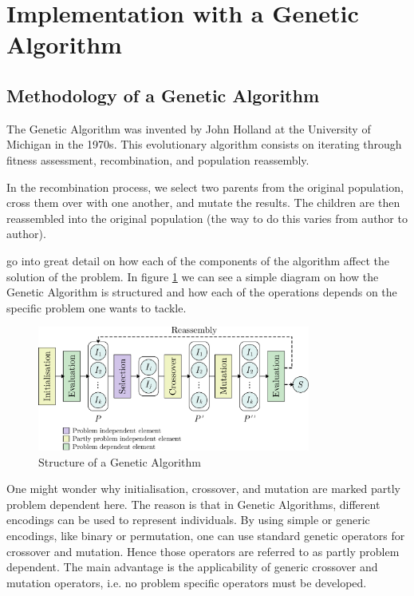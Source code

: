 \section{Implementation with a Genetic Algorithm}\label{sec:implementation}\nocite{Sean2010}
\subsection{Methodology of a Genetic Algorithm}\label{sec:genetic-alg-structure}
The Genetic Algorithm was invented by John Holland at the University of Michigan in the 1970s. This evolutionary algorithm consists on iterating through fitness assessment, recombination, and population reassembly.

In the recombination process, we select two parents from the original population, cross them over with one another, and mutate the results. The children are then reassembled into the original population (the way to do this varies from author to author).

\bigskip
\textcite{Zapfel2010} go into great detail on how each of the components of the algorithm affect the solution of the problem. In figure \ref{fig:structure} we can see a simple diagram on how the Genetic Algorithm is structured and how each of the operations depends on the specific problem one wants to tackle.
\begin{figure}[H]
	\centering
	\includegraphics[width=0.8\textwidth]{images/genetic-algorithm}
	\caption{Structure of a Genetic Algorithm}
	\label{fig:structure}
\end{figure}

One might wonder why initialisation, crossover, and mutation are marked partly problem dependent here. The reason is that in Genetic Algorithms, different encodings can be used to represent individuals. By using simple or generic encodings, like binary or permutation, one can use standard genetic operators for crossover and mutation. Hence those operators are referred to as partly problem dependent. The main advantage is the applicability of generic crossover and mutation operators, i.e. no problem specific operators must be developed.

